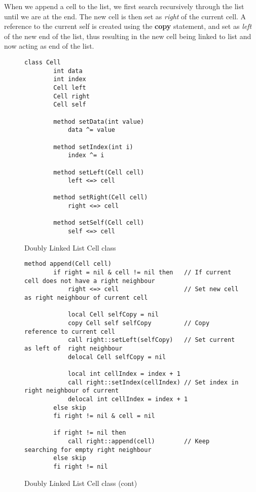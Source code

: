 When we append a cell to the list, we first search recursively through the list until we are at the end. The new cell is then set as \textit{right} of the current cell. A reference to the current self is created using the \textbf{copy} statement, and set as \textit{left} of the new end of the list, thus resulting in the new cell being linked to list and now acting as end of the list.

\begin{figure}[ht!]
    \centering
    \begin{lstlisting}[style = basic, language = roopl] 
        class Cell
        int data
        int index
        Cell left
        Cell right
        Cell self
    
        method setData(int value)
            data ^= value
    
        method setIndex(int i)
            index ^= i    
    
        method setLeft(Cell cell)
            left <=> cell
    
        method setRight(Cell cell)
            right <=> cell
    
        method setSelf(Cell cell)
            self <=> cell
    \end{lstlisting}
    \caption{Doubly Linked List Cell class}
    \label{fig:doubly-linked-list-cell-class}
\end{figure}

\begin{figure}[ht!]
    \centering
    \begin{lstlisting}[style = basic, language = roopl]
    method append(Cell cell)
        if right = nil & cell != nil then   // If current cell does not have a right neighbour
            right <=> cell                  // Set new cell as right neighbour of current cell
        
            local Cell selfCopy = nil      
            copy Cell self selfCopy         // Copy reference to current cell
            call right::setLeft(selfCopy)   // Set current as left of  right neighbour
            delocal Cell selfCopy = nil

            local int cellIndex = index + 1
            call right::setIndex(cellIndex) // Set index in right neighbour of current
            delocal int cellIndex = index + 1
        else skip
        fi right != nil & cell = nil

        if right != nil then
            call right::append(cell)        // Keep searching for empty right neighbour
        else skip
        fi right != nil 
    \end{lstlisting}
    \caption{Doubly Linked List Cell class (cont)}
    \label{fig:doubly-linked-list-cell-class-cont}
\end{figure}

